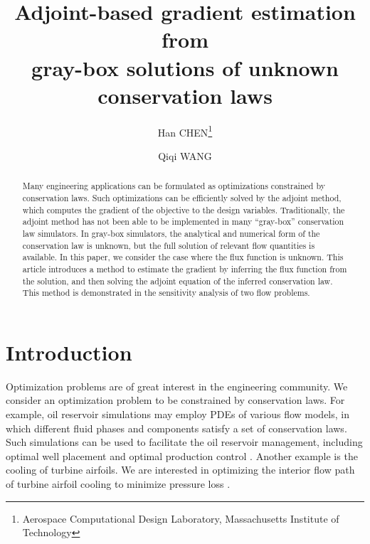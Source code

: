 \documentclass{paper1}
\title{Adjoint-based gradient estimation from \\ gray-box solutions of unknown conservation laws}
\author{Han CHEN\footnote[1]{Aerospace Computational Design Laboratory, Massachusetts Institute of Technology} \and Qiqi WANG\footnotemark[1]}
\begin{document}
\maketitle

\begin{abstract}
Many engineering applications can be formulated as optimizations constrained by conservation laws.
Such optimizations can be efficiently solved by the adjoint method, which computes the gradient of
the objective to the design variables.
Traditionally, the adjoint method has not been able to be
implemented in many ``gray-box'' conservation law 
simulators. In gray-box simulators, the analytical and numerical
form of the conservation law is unknown, but the full solution of relevant flow quantities is
available.
In this paper, we consider the case where the flux function is unknown.
This article introduces a method to estimate the gradient by
inferring the flux function from the solution, and then solving the adjoint equation of
the inferred conservation law.
This method is demonstrated in the sensitivity analysis of two flow problems.
\end{abstract}

\section{Introduction}
\label{background}
Optimization problems are of great interest in the engineering community. We consider an 
optimization problem to be
constrained by conservation laws.
For example, oil reservoir simulations may employ PDEs of various flow models, 
in which different fluid phases and components satisfy a set of conservation laws.
Such simulations can be used to facilitate the oil reservoir management,
including optimal well placement \cite{adjoint well placement} 
and optimal production control \cite{water flooding control,first reservoir opt}.
Another example is the cooling of turbine airfoils. 
We are interested in optimizing the interior flow path
of turbine airfoil cooling to minimize pressure loss
\cite{ubend rans opt 1, ubend rans opt 2}.\\
\end{document}
